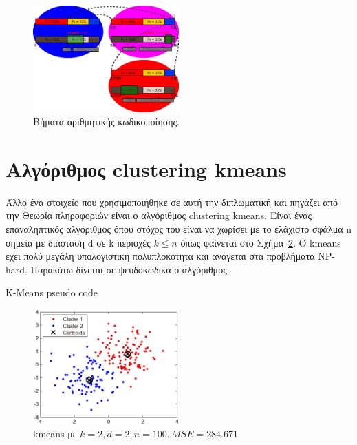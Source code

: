\begin{itemize}
      \begin{figure}[ht!]
          \centering
          \includegraphics[width=0.5\textwidth]{chapter3/ac.jpg}
          \caption{Βήματα αριθμητικής κωδικοποίησης.}
          \label{fig:ac}
      \end{figure}
\end{itemize}

\newpage
\section{Αλγόριθμος clustering kmeans}
\label{section:sect34}

\indent Άλλο ένα στοιχείο που χρησιμοποιήθηκε σε αυτή την διπλωματική και πηγάζει από την Θεωρία πληροφοριών είναι ο αλγόριθμος clustering kmeans. Είναι ένας επαναληπτικός αλγόριθμος όπου στόχος του είναι να χωρίσει με το ελάχιστο σφάλμα n σημεία με διάσταση d σε k περιοχές $ k \leq n $ όπως φαίνεται στο Σχήμα~\ref{fig:kmeans}. O kmeans έχει πολύ μεγάλη υπολογιστική πολυπλοκότητα και ανάγεται στα προβλήματα NP-hard. Παρακάτω δίνεται σε ψευδοκώδικα ο αλγόριθμος.\\

\begin{algorithm}
\begin{algorithmic}[1]
\caption{K-Means pseudo code}
\label{alg:kmeans}
 \label{alg:kmeans:s1}
     \label{alg:kmeans:s4}
         \label{alg:kmeans:s5}
    \ENDFOR
    \ENDFOR
\ENDWHILE
\end{algorithmic}
\end{algorithm}
\begin{figure}[ht!]
  \centering
  \includegraphics[width=0.5\textwidth]{chapter3/kmeans.jpg}
  \caption{kmeans με $k=2,d=2,n=100,MSE=284.671$}
  \label{fig:kmeans}
\end{figure}

